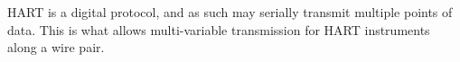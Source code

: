 \vskip 10pt

HART is a digital protocol, and as such may serially transmit multiple points of data.  This is what allows multi-variable transmission for HART instruments along a wire pair.



